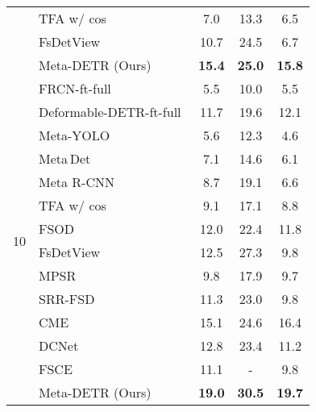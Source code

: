 \documentclass[letterpaper]{article} \usepackage{aaai22}  \usepackage{times}  \usepackage{helvet}  \usepackage{courier}  \usepackage[hyphens]{url}  \usepackage{graphicx} \urlstyle{rm} \def\UrlFont{\rm}  \usepackage{natbib}  \usepackage{caption} \DeclareCaptionStyle{ruled}{labelfont=normalfont,labelsep=colon,strut=off} \frenchspacing  \setlength{\pdfpagewidth}{8.5in}  \setlength{\pdfpageheight}{11in}  \usepackage{algorithm}
\begin{document}
\begin{table}[t!]
\begin{center}
{\begin{tabular}[t]{ c | l | ccc }
& TFA w/ cos\;\cite{fsdet}\,\, & 7.0 & 13.3 & 6.5 \\

& FsDetView\;\cite{FSDetView}\, & 10.7 & 24.5 & 6.7 \\

& \cellcolor{black!6}Meta-DETR (Ours)\, & \cellcolor{black!6}\textbf{15.4} & \cellcolor{black!6}\textbf{25.0} & \cellcolor{black!6}\textbf{15.8} \\

\midrule[0.68pt]

\multirow{14}{*}{10} & FRCN-ft-full\;\cite{FasterRCNN}\,\, & 5.5 & 10.0 & 5.5 \\

& Deformable-DETR-ft-full\,\cite{DeformableDETR}\, & 11.7 & 19.6 & 12.1 \\

& Meta-YOLO\;\cite{FewshotReweighting} & 5.6 & 12.3 & 4.6 \\

& Meta\,Det\;\cite{metadet} & 7.1 & 14.6 & 6.1 \\

& Meta R-CNN\;\cite{metarcnn} & 8.7 & 19.1 & 6.6 \\

& TFA w/ cos\;\cite{fsdet}\,\, & 9.1 & 17.1 & 8.8 \\

& FSOD\;\cite{fsod} & 12.0 & 22.4 & 11.8 \\

& FsDetView\;\cite{FSDetView}\, & 12.5 & 27.3 & 9.8 \\

& MPSR\;\cite{MPSR}\, & 9.8 & 17.9 & 9.7  \\

& SRR-FSD\;\cite{SRR-FSD}\, & 11.3 & 23.0 & 9.8 \\

& CME\;\cite{CME}\, & 15.1 & 24.6 & 16.4 \\

& DCNet\;\cite{DenseRelationDistillation}\,\, & 12.8 & 23.4 & 11.2 \\

& FSCE\;\cite{fsce}\,\, & 11.1 & - & 9.8 \\

& \cellcolor{black!6}Meta-DETR (Ours)\, & \cellcolor{black!6}\textbf{19.0} & \cellcolor{black!6}\textbf{30.5} & \cellcolor{black!6}\textbf{19.7}\\

\midrule[0.66pt]


\end{tabular}}
\end{center}
\end{table}
\end{document}
